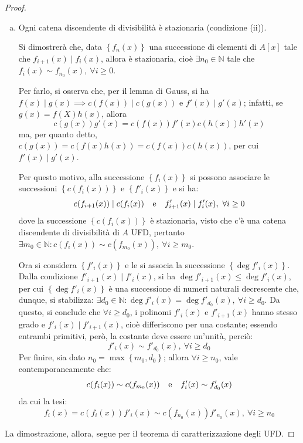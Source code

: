\documentclass[12pt]{scrartcl}
\theoremstyle{style}
\numberwithin{equation}{subsection}
\begin{document}
\begin{proof}
\begin{enumerate}[(a).]
\begin{itemize}
				\end{itemize}



			\item Ogni catena discendente di divisibilit\`a \`e stazionaria (condizione (ii)).

				Si dimostrer\`a che, data $\left\{ f_n(x) \right\} $ una successione di elementi di $A[x]$ tale che $f_{i+1} (x)  \mid f_i(x)$, allora \`e stazionaria, cio\`e $\exists n_0 \in \mathbb{N}$ tale che $f_i(x) \sim f_{n_0} (x) , \ \forall i\ge 0$.

				Per farlo, si osserva che, per il lemma di Gauss, si ha $f(x)  \mid g(x) \implies c(f(x))  \mid c(g(x)) $ e $f'(x)  \mid g'(x)$; infatti, se $g(x) = f(X) h(x)$, allora
				\[
				c(g(x))g'(x) = c(f(x)) f'(x) c(h(x)) h'(x)
				\] 
				ma, per quanto detto, $c(g(x)) = c(f(x) h(x))= c(f(x)) c(h(x))$, per cui $f'(x)  \mid g'(x)$.

				Per questo motivo, alla successione $\left\{ f_i(x) \right\} $ si possono associare le successioni $\left\{ c(f_i(x)) \right\} $ e $\left\{ f'_i(x) \right\} $ e si ha:
				\[
				c(f_{i+1} (x)) \mid c(f_i(x)) \hspace{.25cm} \text{ e } \hspace{.25cm} f'_{i+1} (x)  \mid f'_i(x) , \ \forall i\ge 0
				\] 
				dove la successione $\left\{ c(f_i(x)) \right\} $ \`e stazionaria, visto che c'\`e una catena discendente di divisibilit\`a di $A$ UFD, pertanto $\exists m_0 \in \mathbb{N} : c(f_i(x)) \sim c(f_{m_0} (x)) , \ \forall i\ge m_0 $.

				Ora si considera $\left\{ f'_i(x) \right\} $ e le si associa la successione $\left\{ \operatorname{deg} f'_i(x) \right\} $.
				Dalla condizione $f'_{i+1} (x)  \mid f'_i(x)  $, si ha $\operatorname{deg} f'_{i+1} (x)  \le \operatorname{deg} f'_i(x)$, per cui $\left\{ \operatorname{deg} f'_i(x) \right\} $ \`e una successione di numeri naturali decrescente che, dunque, si stabilizza: $\exists d_0 \in \mathbb{N} : \operatorname{deg} f'_i(x) = \operatorname{deg} f'_{d_0} (x) ,\ \forall i \ge d_0$.
				Da questo, si conclude che $\forall i\ge d_0$, i polinomi $f'_i(x)$ e $f'_{i+1} (x)$ hanno stesso grado e $f'_i(x)  \mid f'_{i+1} (x)$, cio\`e differiscono per una costante; essendo entrambi primitivi, per\`o, la costante deve essere un'unit\`a, perci\`o:
				\[
				f'_i(x) \sim f'_{d_0} (x), \ \forall i \ge d_0
				\] 
				Per finire, sia dato $n_0 = \max \left\{ m_0,d_0 \right\}$; allora $\forall i\ge n_0$, vale contemporaneamente che:
				\[
				c(f_i(x)) \sim c(f_{m_0} (x)) \hspace{.25cm} \text{ e } \hspace{.25cm} f'_i(x) \sim f'_{d_0} (x)
				\] 
				da cui la tesi:
				\[
				f_i(x) = c(f_i(x)) f'_i(x) \sim c(f_{n_0} (x)) f'_{n_0} (x) , \ \forall i\ge n_0
				\] 
		\end{enumerate}
		La dimostrazione, allora, segue per il teorema di caratterizzazione degli UFD.
	\end{proof}
\end{document}
